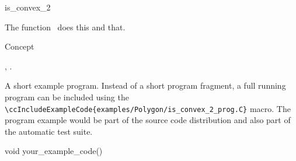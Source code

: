 

\begin{ccRefFunction}{is_convex_2}  %


\ccDefinition
  
The function \ccRefName\ does this and that.



\ccIsModel

Concept

\ccSeeAlso

,
.

\ccExample

A short example program.
Instead of a short program fragment, a full running program can be
included using the 
\verb|\ccIncludeExampleCode{examples/Polygon/is_convex_2_prog.C}| 
macro. The program example would be part of the source code distribution and
also part of the automatic test suite.

\begin{ccExampleCode}
void your_example_code() {
}
\end{ccExampleCode}


\end{ccRefFunction}


